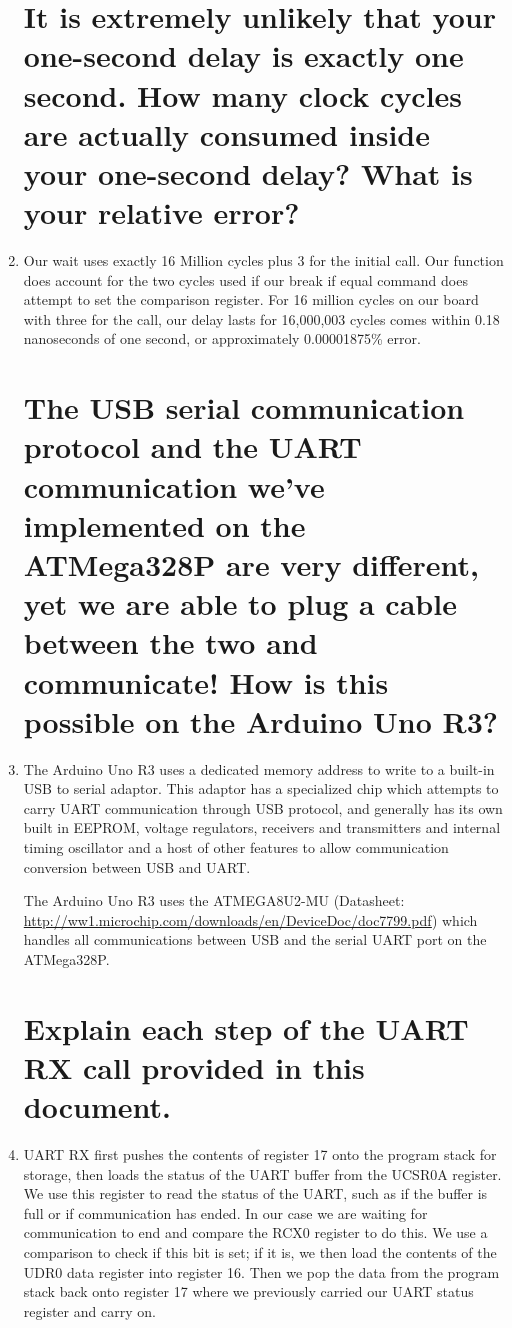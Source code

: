 \documentclass[letterpaper,11pt]{texMemo} %
\begin{document}
\begin{enumerate}

\section{It is extremely unlikely that your one-second delay is exactly one second. How many clock
cycles are actually consumed inside your one-second delay? What is your relative error?}

\item Our wait uses exactly 16 Million cycles plus 3 for the initial call. Our function does account for the two cycles used if our break if equal command does attempt to set the comparison register. For 16 million cycles on our board with three for the call, our delay lasts for 16,000,003 cycles comes within 0.18 nanoseconds of one second, or approximately 0.00001875\% error.

\section{The USB serial communication protocol and the UART communication we’ve implemented
on the ATMega328P are very different, yet we are able to plug a cable between the two and
communicate! How is this possible on the Arduino Uno R3?}

\item The Arduino Uno R3 uses a dedicated memory address to write to a built-in USB to serial adaptor. This adaptor has a specialized chip which attempts to carry UART communication through USB protocol, and generally has its own built in EEPROM, voltage regulators, receivers and transmitters and internal timing oscillator and a host of other features to allow communication conversion between USB and UART.

The Arduino Uno R3 uses the ATMEGA8U2-MU (Datasheet: \url{http://ww1.microchip.com/downloads/en/DeviceDoc/doc7799.pdf}) which handles all communications between USB and the serial UART port on the ATMega328P.

\section{Explain each step of the UART RX call provided in this document.}

\item UART RX first pushes the contents of register 17 onto the program stack for storage, then loads the status of the UART buffer from the UCSR0A register. We use this register to read the status of the UART, such as if the buffer is full or if communication has ended. In our case we are waiting for communication to end and compare the RCX0 register to do this. We use a comparison to check if this bit is set; if it is, we then load the contents of the UDR0 data register into register 16. Then we pop the data from the program stack back onto register 17 where we previously carried our UART status register and carry on.

\end{enumerate}
\end{document}
